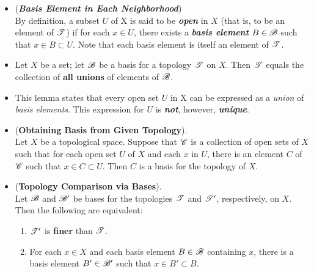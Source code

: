 \documentclass[11pt]{article}
\begin{document}
\begin{itemize}
\item \begin{remark} (\emph{\textbf{Basis Element in Each Neighborhood}})\\
By definition, a subset $U$ of X is said to be \emph{\textbf{open}} in $X$ (that is, to be an element of ${\mathscr T}$) if for each $x \in U$, there exists a \emph{\textbf{basis element}} $B \in {\mathscr B}$ such that $x \in B \subset U$. Note that each basis element is itself an element of ${\mathscr T}$.
\end{remark}

\item \begin{lemma}
Let $X$ be a set; let ${\mathscr B}$ be a basis for a topology ${\mathscr T}$ on $X$. Then ${\mathscr T}$ equals the collection of \textbf{all unions} of elements of ${\mathscr B}$.
\end{lemma}

\item \begin{remark}
This lemma states that every open set $U$ in X can be expressed as a \emph{union} of \emph{basis elements}. This expression for $U$ is \emph{\textbf{not}}, however, \emph{\textbf{unique}}.
\end{remark}

\item \begin{lemma} (\textbf{Obtaining Basis from Given Topology}). \citep{munkres2000topology}\\
Let $X$ be a topological space. Suppose that ${\mathscr C}$ is a collection of open sets of $X$ such that for each open set $U$ of $X$ and each $x$ in $U$, there is an element $C$ of ${\mathscr C}$ such that $x \in C \subset U$. Then $C$ is a basis for the topology of $X$.
\end{lemma}

\item \begin{lemma} (\textbf{Topology Comparison via Bases}). \citep{munkres2000topology}\\
Let ${\mathscr B}$ and ${\mathscr B}'$ be bases for the topologies ${\mathscr T}$ and ${\mathscr T}'$, respectively, on $X$. Then the following are equivalent:
\begin{enumerate}
\item  ${\mathscr T}'$ is \textbf{finer} than ${\mathscr T}$.
\item For each $x \in X$ and each basis element $B \in {\mathscr B}$ containing $x$, there is a basis element $B' \in {\mathscr B}'$ such that $x \in B' \subset B$.
\end{enumerate}
\end{lemma}


\end{itemize}
\end{document}
